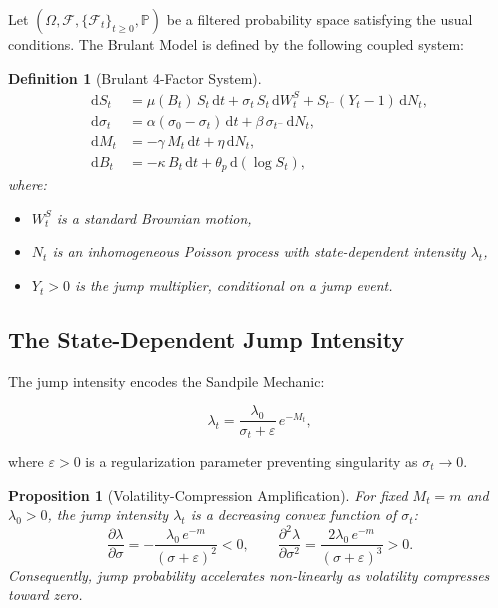 \documentclass[11pt,a4paper]{article}
\newtheorem{proposition}[theorem]{Proposition}
\newtheorem{definition}[theorem]{Definition}
\newcommand{\Prob}{\mathbb{P}}
\newcommand{\diff}{\mathrm{d}}
\newcommand{\dt}{\diff t}
\begin{document}
Let $(\Omega, \mathcal{F}, \{\mathcal{F}_t\}_{t \geq 0}, \Prob)$ be a
filtered probability space satisfying the usual conditions. The Brulant
Model is defined by the following coupled system:

\begin{definition}[Brulant 4-Factor System]
\label{def:brulant}
\begin{align}
  \diff S_t &= \mu(B_t)\, S_t \,\dt + \sigma_t\, S_t \,\diff W_t^S
    + S_{t^-}(Y_t - 1)\,\diff N_t,
    \label{eq:price} \\[6pt]
  \diff \sigma_t &= \alpha(\sigma_0 - \sigma_t)\,\dt
    + \beta\,\sigma_{t^-}\,\diff N_t,
    \label{eq:vol} \\[6pt]
  \diff M_t &= -\gamma\, M_t\,\dt + \eta\,\diff N_t,
    \label{eq:memory} \\[6pt]
  \diff B_t &= -\kappa\, B_t\,\dt + \theta_p\,\diff(\log S_t),
    \label{eq:buffer}
\end{align}
where:
\begin{itemize}[nosep]
  \item $W_t^S$ is a standard Brownian motion,
  \item $N_t$ is an inhomogeneous Poisson process with state-dependent intensity
    $\lambda_t$,
  \item $Y_t > 0$ is the jump multiplier, conditional on a jump event.
\end{itemize}
\end{definition}

\subsection{The State-Dependent Jump Intensity}
\label{sec:intensity}

The jump intensity encodes the Sandpile Mechanic:

\begin{equation}
  \lambda_t = \frac{\lambda_0}{\sigma_t + \varepsilon}\, e^{-M_t},
  \label{eq:intensity}
\end{equation}

where $\varepsilon > 0$ is a regularization parameter preventing singularity
as $\sigma_t \to 0$.

\begin{proposition}[Volatility-Compression Amplification]
\label{prop:compression}
For fixed $M_t = m$ and $\lambda_0 > 0$, the jump intensity $\lambda_t$
is a decreasing convex function of $\sigma_t$:
\[
  \frac{\partial \lambda}{\partial \sigma} = -\frac{\lambda_0\, e^{-m}}{(\sigma + \varepsilon)^2} < 0,
  \qquad
  \frac{\partial^2 \lambda}{\partial \sigma^2} = \frac{2\lambda_0\, e^{-m}}{(\sigma + \varepsilon)^3} > 0.
\]
Consequently, jump probability accelerates non-linearly as volatility
compresses toward zero.
\end{proposition}
\end{document}
